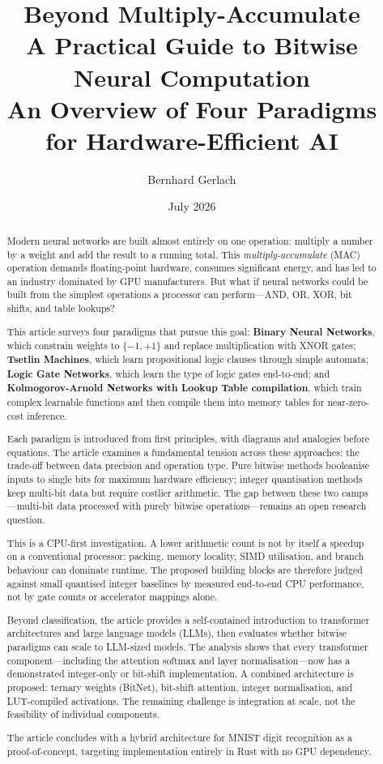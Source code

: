 \documentclass[11pt,a4paper]{article}
\title{%
  \textbf{Beyond Multiply-Accumulate}\\[0.5em]
  \Large A Practical Guide to Bitwise Neural Computation\\[0.3em]
  \large An Overview of Four Paradigms for Hardware-Efficient AI
}
\author{Bernhard Gerlach}
\date{July 2026}
\theoremstyle{definition}
\theoremstyle{remark}
\theoremstyle{plain}
\begin{document}

\maketitle

\begin{abstract}
Modern neural networks are built almost entirely on one operation:
multiply a number by a weight and add the result to a running total.
This \emph{multiply-accumulate} (MAC) operation demands floating-point
hardware, consumes significant energy, and has led to an industry
dominated by GPU manufacturers. But what if neural networks could
be built from the simplest operations a processor can perform---AND,
OR, XOR, bit shifts, and table lookups?

This article surveys four paradigms that pursue this goal:
\textbf{Binary Neural Networks}, which constrain weights to $\{-1, +1\}$
and replace multiplication with XNOR gates;
\textbf{Tsetlin Machines}, which learn propositional logic clauses
through simple automata;
\textbf{Logic Gate Networks}, which learn the type of logic gates
end-to-end; and
\textbf{Kolmogorov-Arnold Networks with Lookup Table compilation},
which train complex learnable functions and then compile them
into memory tables for near-zero-cost inference.

Each paradigm is introduced from first principles, with diagrams
and analogies before equations. The article examines a fundamental
tension across these approaches: the trade-off between data
precision and operation type. Pure bitwise methods booleanise inputs
to single bits for maximum hardware efficiency; integer
quantisation methods keep multi-bit data but require costlier
arithmetic. The gap between these two camps---multi-bit data
processed with purely bitwise operations---remains an open research
question.

This is a CPU-first investigation. A lower arithmetic count is not by
itself a speedup on a conventional processor: packing, memory locality,
SIMD utilisation, and branch behaviour can dominate runtime. The proposed
building blocks are therefore judged against small quantised integer
baselines by measured end-to-end CPU performance, not by gate counts or
accelerator mappings alone.

Beyond classification, the article provides a self-contained
introduction to transformer architectures and large language models
(LLMs), then evaluates whether bitwise paradigms can scale to
LLM-sized models. The analysis shows that every transformer
component---including the attention softmax and layer
normalisation---now has a demonstrated integer-only or bit-shift
implementation. A combined architecture is proposed: ternary
weights (BitNet), bit-shift attention, integer normalisation, and
LUT-compiled activations. The remaining challenge is integration
at scale, not the feasibility of individual components.

The article concludes with a hybrid architecture for MNIST digit
recognition as a proof-of-concept, targeting implementation
entirely in Rust with no GPU dependency.
\end{abstract}
\end{document}
